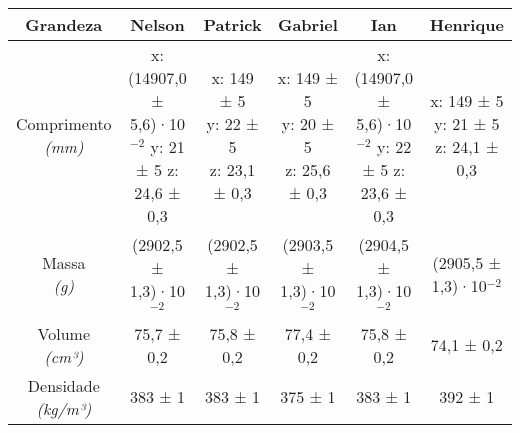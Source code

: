 \documentclass{article}
\begin{document}
\begin{table}[h!]
\centering
\begin{tabular}{c c c c c c }
\toprule
Grandeza & Nelson & Patrick & Gabriel & Ian & Henrique\\
\midrule
\shortstack{Comprimento\\\textit{(mm)}} & \shortstack{x: (14907,0 ± 5,6)·10$^{-2}$\\y: 21 ± 5\\z: 24,6 ± 0,3} & \shortstack{x: 149 ± 5\\y: 22 ± 5\\z: 23,1 ± 0,3} & \shortstack{x: 149 ± 5\\y: 20 ± 5\\z: 25,6 ± 0,3} & \shortstack{x: (14907,0 ± 5,6)·10$^{-2}$\\y: 22 ± 5\\z: 23,6 ± 0,3} & \shortstack{x: 149 ± 5\\y: 21 ± 5\\z: 24,1 ± 0,3}\\[4pt]
\shortstack{Massa\\\textit{(g)}} & (2902,5 ± 1,3)·10$^{-2}$ & (2902,5 ± 1,3)·10$^{-2}$ & (2903,5 ± 1,3)·10$^{-2}$ & (2904,5 ± 1,3)·10$^{-2}$ & (2905,5 ± 1,3)·10$^{-2}$\\[4pt]
\shortstack{Volume\\\textit{(cm³)}} & 75,7 ± 0,2 & 75,8 ± 0,2 & 77,4 ± 0,2 & 75,8 ± 0,2 & 74,1 ± 0,2\\[4pt]
\shortstack{Densidade\\\textit{(kg/m³)}} & 383 ± 1 & 383 ± 1 & 375 ± 1 & 383 ± 1 & 392 ± 1\\[4pt]
\bottomrule
\end{tabular}
\end{table}
\end{document}
